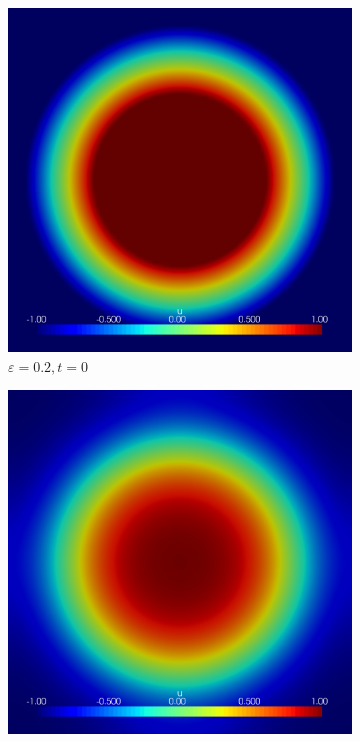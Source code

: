 \begin{figure}[h]
	\centering
	
	\begin{subfigure}[b]{0.3\linewidth}
		\includegraphics[width=\linewidth]{numerical_simulation/bump/eps_0.2000000.vtu}
		\caption{$ \varepsilon = 0.2, t = 0 $}
	\end{subfigure}
	\hfill
	\begin{subfigure}[b]{0.3\linewidth}
		\includegraphics[width=\linewidth]{numerical_simulation/bump/eps_0.2000015.vtu}

\end{subfigure}
\end{figure}
